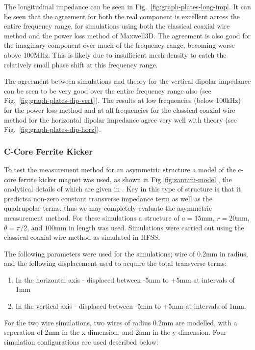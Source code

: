 \documentclass[12pt,a4paper,twopage,openright]{article}
\begin{document}
The longitudinal impedance can be seen in Fig.~\ref{fig:graph-plates-long-imp}. It can be seen that the agreement for both the real component is excellent across the entire frequency range, for simulations using both the classical coaxial wire method and the power loss method of Maxwell3D. The agreement is also good for the imaginary component over much of the frequency range, becoming worse above 100MHz. This is likely due to insufficient mesh density to catch the relatively small phase shift at this frequency range.

The agreement between simulations and theory for the vertical dipolar impedance can be seen to be very good over the entire frequency range also (see Fig.~\ref{fig:graph-plates-dip-vert}). The results at low frequencies (below 100kHz) for the power loss method and at all frequencies for the classical coaxial wire method for the horizontal dipolar impedance agree very well with theory (see Fig.~\ref{fig:graph-plates-dip-horz}). 

\subsubsection{C-Core Ferrite Kicker}

To test the measurement method for an asymmetric structure a model of the c-core ferrite kicker magnet was used, as shown in Fig.\ref{fig:zannini-model}, the analytical details of which are given in \cite{Zannini:cCoreFerrite}. Key in this type of structure is that it predictsa non-zero constant transverse impedance term as well as the quadrupolar terms, thus we may completely evaluate the asymmetric measurement method. For these simulations a structure of $a=15$mm, $r=20$mm, $\theta = \pi / 2$, and $100$mm in length was used. Simulations were carried out using the classical coaxial wire method as simulated in HFSS.

The following parameters were used for the simulations; wire of 0.2mm in radius, and the following displacement used to acquire the total transverse terms:

\begin{enumerate}
\item{In the horizontal axis -  displaced between -5mm to +5mm at intervals of 1mm}
\item{In the vertical axis - displaced between -5mm to +5mm at intervals of 1mm.}
\end{enumerate}

For the two wire simulations, two wires of radius 0.2mm are modelled, with a seperation of 2mm in the x-dimension, and 2mm in the y-dimension. Four simulation configurations are used described below:
\end{document}
